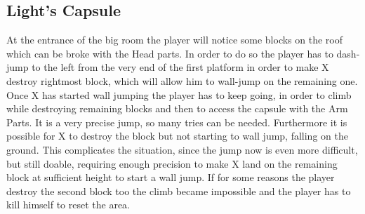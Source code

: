 \subsection{Light's Capsule}
At the entrance of the big room the player will notice some blocks on the roof which can be broke with the Head parts. In order to do so the player has to dash-jump to the left from the very end of the first platform in order to make X destroy rightmost block, which will allow him to wall-jump on the remaining one. Once X has started wall jumping the player has to keep going, in order to climb while destroying remaining blocks and then to access the capsule with the Arm Parts. It is a very precise jump, so many tries can be needed. Furthermore it is possible for X to destroy the block but not starting to wall jump, falling on the ground. This complicates the situation, since the jump now is even more difficult, but still doable, requiring enough precision to make X land on the remaining block at sufficient height to start a wall jump. If for some reasons the player destroy the second block too the climb became impossible and the player has to kill himself to reset the area.
